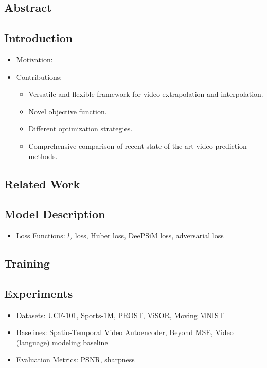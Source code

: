 \documentclass{article}
\begin{document}
    \subsection*{Abstract}

    \subsection{Introduction}\label{subsec:Flexible_Spatio_Temporal_Networks_for_Video_Prediction:introduction}
    \begin{itemize}
        \item Motivation:
        \item Contributions:
        \begin{itemize}
            \item Versatile and flexible framework for video extrapolation and interpolation.
            \item Novel objective function.
            \item Different optimization strategies.
            \item Comprehensive comparison of recent state-of-the-art video prediction methods.
        \end{itemize}
    \end{itemize}

    \subsection{Related Work}\label{subsec:Flexible_Spatio_Temporal_Networks_for_Video_Prediction:related-work}

    \subsection{Model Description}\label{subsec:Flexible_Spatio_Temporal_Networks_for_Video_Prediction:model-description}
    \begin{itemize}
        \item Loss Functions: $l_2$ loss, Huber loss, DeePSiM loss, adversarial loss
    \end{itemize}

    \subsection{Training}\label{subsec:Flexible_Spatio_Temporal_Networks_for_Video_Prediction:training}

    \subsection{Experiments}\label{subsec:Flexible_Spatio_Temporal_Networks_for_Video_Prediction:experiments}
    \begin{itemize}
        \item Datasets: UCF-101, Sports-1M, PROST, ViSOR, Moving MNIST
        \item Baselines: Spatio-Temporal Video Autoencoder, Beyond MSE, Video (language) modeling baseline
        \item Evaluation Metrics: PSNR, sharpness
    \end{itemize}
    \newpage
\end{document}
